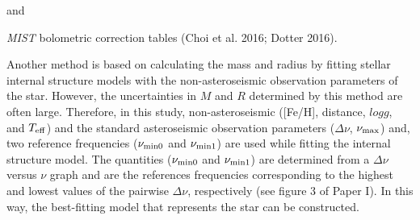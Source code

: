 \documentclass[a4paper,fleqn,usenatbib]{mnras}     %
\begin{document}
 and {\emph{MIST} bolometric correction tables (Choi et al. 2016; Dotter 2016). %


 
Another method is based on 
calculating the mass and radius by 
fitting stellar internal structure models with 
the non-asteroseismic observation parameters of the star.
However, the uncertainties in  $M$ and $R$ 
determined by this method are often large. 
Therefore, in this study, 
non-asteroseismic  ([Fe/H], distance, $logg$,
 and $T_{\rm eff}$)
and the standard
 asteroseismic observation parameters
($\Delta \nu$, $\nu _{\rm max}$) and,
 two reference frequencies 
($\nu _{\rm min0}$ and $\nu _{\rm min1}$)
are used while fitting the 
internal structure model.
The quantities 
($\nu _{\rm min0}$ and $\nu _{\rm min1}$)
are determined from a $\Delta \nu$
versus $\nu$ graph and 
are the references frequencies 
corresponding to the highest and lowest values of the 
pairwise $\Delta \nu$, respectively (see figure 3 of Paper I).
In this way, the best-fitting model 
that represents the star can be constructed.

}
\end{document}
